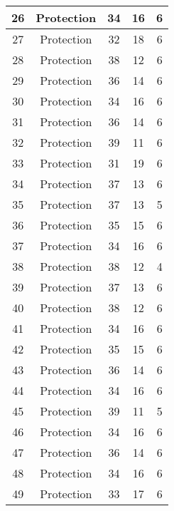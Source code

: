 \documentclass[results.tex]{subfiles}
\begin{document}
\begin{center}
\begin{tabular}{| c || c | c | c | c |}
    \hline
    26 & Protection & 34 & 16 & 6 \\ 
    \hline
    27 & Protection & 32 & 18 & 6 \\ 
    \hline
    28 & Protection & 38 & 12 & 6 \\ 
    \hline
    29 & Protection & 36 & 14 & 6 \\ 
    \hline
    30 & Protection & 34 & 16 & 6 \\ 
    \hline
    31 & Protection & 36 & 14 & 6 \\ 
    \hline
    32 & Protection & 39 & 11 & 6 \\ 
    \hline
    33 & Protection & 31 & 19 & 6 \\ 
    \hline
    34 & Protection & 37 & 13 & 6 \\ 
    \hline
    35 & Protection & 37 & 13 & 5 \\ 
    \hline
    36 & Protection & 35 & 15 & 6 \\ 
    \hline
    37 & Protection & 34 & 16 & 6 \\ 
    \hline
    38 & Protection & 38 & 12 & 4 \\ 
    \hline
    39 & Protection & 37 & 13 & 6 \\ 
    \hline
    40 & Protection & 38 & 12 & 6 \\ 
    \hline
    41 & Protection & 34 & 16 & 6 \\ 
    \hline
    42 & Protection & 35 & 15 & 6 \\ 
    \hline
    43 & Protection & 36 & 14 & 6 \\ 
    \hline
    44 & Protection & 34 & 16 & 6 \\ 
    \hline
    45 & Protection & 39 & 11 & 5 \\ 
    \hline
    46 & Protection & 34 & 16 & 6 \\ 
    \hline
    47 & Protection & 36 & 14 & 6 \\ 
    \hline
    48 & Protection & 34 & 16 & 6 \\ 
    \hline
    49 & Protection & 33 & 17 & 6 \\ 
    \hline   \end{tabular}
\end{center}
\end{document}
